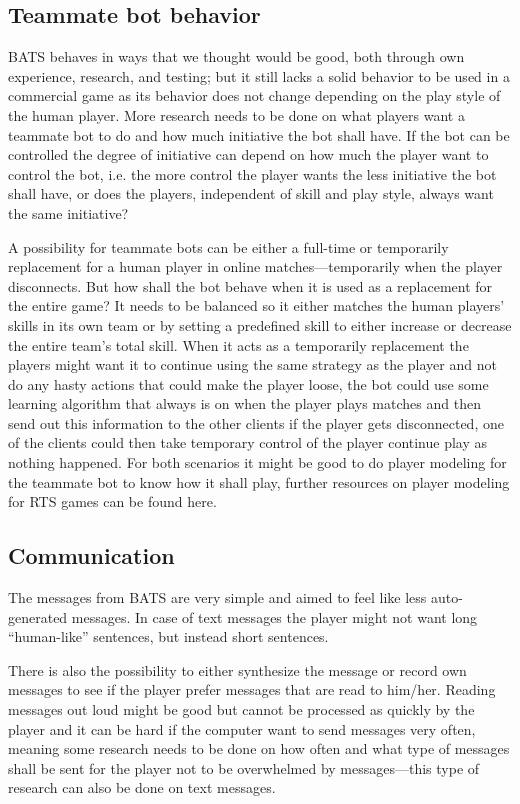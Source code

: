 \subsection{Teammate bot behavior}
BATS behaves in ways that we thought would be good, both through own experience, research, and
testing; but it still lacks a solid behavior to be used in a commercial game as its behavior does
not change depending on the play style of the human player. More research needs to be done on what
players want a teammate bot to do and how much initiative the bot shall have. If the bot can be
controlled the degree of initiative can depend on how much the player want to control the bot, i.e.
the more control the player wants the less initiative the bot shall have, or does the players,
independent of skill and play style, always want the same initiative?

A possibility for teammate bots can be either a full-time or temporarily replacement for a human
player in online matches—temporarily when the player disconnects. But how shall the bot behave when
it is used as a replacement for the entire game? It needs to be balanced so it either matches the
human players' skills in its own team or by setting a predefined skill to either increase or
decrease the entire team's total skill. When it acts as a temporarily replacement the players might
want it to continue using the same strategy as the player and not do any hasty actions that could
make the player loose, the bot could use some learning algorithm that always is on when the player
plays matches and then send out this information to the other clients if the player gets
disconnected, one of the clients could then take temporary control of the player continue play as
nothing happened.  For both scenarios it might be good to do player modeling for the teammate bot to
know how it shall play, further resources on player modeling for RTS games can be found
here\cite{bakkes09, jansen07, kabanza10, schadd07, synnaeve11}.

\subsection{Communication}
The messages from BATS are very simple and aimed to feel like less auto-generated messages. In case
of text messages the player might not want long ``human-like'' sentences, but instead short
sentences.

There is also the possibility to either synthesize the message or record own messages to see if the
player prefer messages that are read to him/her.  Reading messages out loud might be good but cannot
be processed as quickly by the player and it can be hard if the computer want to send messages very
often, meaning some research needs to be done on how often and what type of messages shall be sent
for the player not to be overwhelmed by messages—this type of research can also be done on text
messages.

